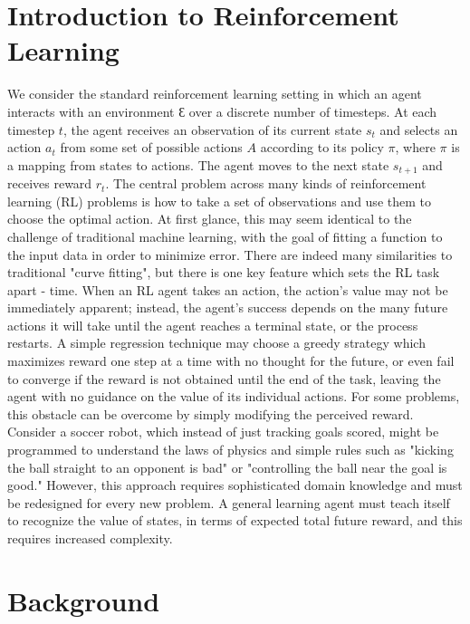 \documentclass[journal,onecolumn]{IEEEtran}
\begin{document}
\section{Introduction to Reinforcement Learning}
We consider the standard reinforcement learning setting in which an agent interacts with an environment $Ɛ$ over a discrete number of timesteps. At each timestep $t$, the agent receives an observation of its current state $s_{t}$  and selects an action $a_{t}$  from some set of possible actions $A$ according to its policy $\pi$, where $\pi$ is a mapping from states to actions. The agent moves to the next state $s_{t+1}$ and receives reward $r_{t}$. The central problem across many kinds of reinforcement learning (RL) problems is how to take a set of observations and use them to choose the optimal action.  At first glance, this may seem identical to the challenge of traditional machine learning, with the goal of fitting a function to the input data in order to minimize error.  There are indeed many similarities to traditional "curve fitting", but there is one key feature which sets the RL task apart - time.  When an RL agent takes an action, the action's value may not be immediately apparent; instead, the agent's success depends on the many future actions it will take until the agent reaches a terminal state, or the process restarts.  A simple regression technique may choose a greedy strategy which maximizes reward one step at a time with no thought for the future, or even fail to converge if the reward is not obtained until the end of the task, leaving the agent with no guidance on the value of its individual actions.  For some problems, this obstacle can be overcome by simply modifying the perceived reward. Consider a soccer robot, which instead of just tracking goals scored, might be programmed to understand the laws of physics and simple rules such as "kicking the ball straight to an opponent is bad" or "controlling the ball near the goal is good."  However, this approach requires sophisticated domain knowledge and must be redesigned for every new problem.  A general learning agent must teach itself to recognize the value of states, in terms of expected total future reward, and this requires increased complexity.
\section{Background}
\end{document}
